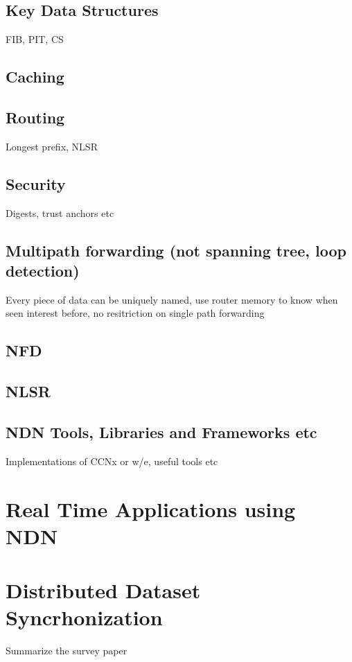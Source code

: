 \subsection{Key Data Structures}
FIB, PIT, CS

\subsection{Caching}


\subsection{Routing}
Longest prefix, NLSR 

\subsection{Security}
Digests, trust anchors etc


\subsection{Multipath forwarding (not spanning tree, loop detection)}
Every piece of data can be uniquely named, use router memory to know when seen interest before, no resitriction on single path forwarding

\subsection{NFD}


\subsection{NLSR}


\subsection{NDN Tools, Libraries and Frameworks etc}
Implementations of CCNx or w/e, useful tools etc





\section{Real Time Applications using NDN}

\section{Distributed Dataset Syncrhonization}
Summarize the survey paper
